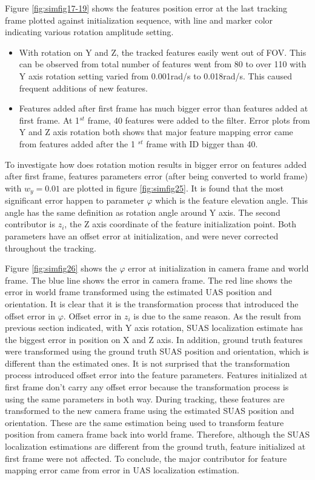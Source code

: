 Figure \ref{fig:simfig17-19} shows the features position error at the last tracking frame plotted against initialization sequence, with line and marker color indicating various rotation amplitude setting.

\begin{itemize}
  \item With rotation on Y and Z, the tracked features easily went out of FOV. This can be observed from total number of features went from 80 to over 110 with Y axis rotation setting varied from 0.001rad/s to 0.018rad/s. This caused frequent additions of new features.
  \item Features added after first frame has much bigger error than features added at first frame. At 1$^{st}$ frame, 40 features were added to the filter. Error plots from Y and Z axis rotation both shows that major feature mapping error came from features added after the 1 $^{st}$ frame with ID bigger than 40.
\end{itemize}
\FloatBarrier

To investigate how does rotation motion results in bigger error on features added after first frame, features parameters error (after being converted to world frame) with $w_y = 0.01$ are plotted in figure \ref{fig:simfig25}. It is found that the most significant error happen to parameter $\varphi$ which is the feature elevation angle. This angle has the same definition as rotation angle around Y axis. The second contributor is $z_i$, the Z axis coordinate of the feature initialization point. Both parameters have an offset error at initialization, and were never corrected throughout the tracking.

Figure \ref{fig:simfig26} shows the $\varphi$ error at initialization in camera frame and world frame. The blue line shows the error in camera frame. The red line shows the error in world frame transformed using the estimated UAS position and orientation. It is clear that it is the transformation process that introduced the offset error in $\varphi$. Offset error in $z_i$ is due to the same reason. As the result from previous section indicated, with Y axis rotation, SUAS localization estimate has the biggest error in position on X and Z axis. In addition, ground truth features were transformed using the ground truth SUAS position and orientation, which is different than the estimated ones. It is not surprised that the transformation process introduced offset error into the feature parameters. Features initialized at first frame don't carry any offset error because the transformation process is using the same parameters in both way. During tracking, these features are transformed to the new camera frame using the estimated SUAS position and orientation. These are the same estimation being used to transform feature position from camera frame back into world frame. Therefore, although the SUAS localization estimations are different from the ground truth, feature initialized at first frame were not affected. To conclude, the major contributor for feature mapping error came from error in UAS localization estimation.

